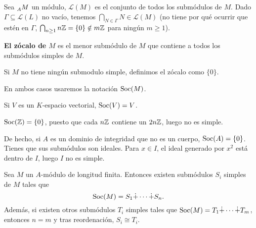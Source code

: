 Sea \(\prescript{}{A}{M}\) un módulo, \(\mathcal{L}(M)\)
es el conjunto de todos los submódulos de \(M\).
Dado \(\Gamma\subseteq\mathcal{L}(L)\) no vacío,
tenemos \(\bigcap_{N\in\Gamma}
N\in\mathcal{L}(M)\) (no tiene por qué ocurrir que estén en \(\Gamma\),
\(\bigcap_{n\ge 1} n\mathbb{Z}=\{0\}\notin m\mathbb{Z}\) para ningún \(m\ge 1\)).


\begin{df}[Zócalo]
  \textbf{El zócalo de \(M\)} es el menor submódulo de \(M\) que contiene a todos
  los submódulos simples de \(M\).

  Si \(M\) no tiene ningún submodulo simple, definimos el zócalo como
  \(\{0\}\).

  En ambos casos usaremos la notación \(\operatorname{Soc}(M)\).
\end{df}

\begin{ejemplo}
  Si \(V\) es un \(K\)-espacio vectorial, \(\operatorname{Soc}(V)=V\).
\end{ejemplo}

\begin{ejemplo}
  \(\operatorname{Soc}(\mathbb{Z})=\{0\}\), puesto que cada \(n\mathbb{Z}\) contiene
  un \(2n\mathbb{Z}\), luego no es simple.
\end{ejemplo}

De hecho, si \(A\) es un dominio de
integridad que no es un cuerpo, \(\operatorname{Soc}(A)=\{0\}\). Tienes que sus submódulos
son ideales. Para \(x\in I\), el ideal generado por \(x^2\) está dentro de
\(I\), luego \(I\) no es simple.

\begin{prop}
  Sea \(M\) un \(A\)-módulo de longitud finita. Entonces existen submódulos
  \(S_i\) simples de \(M\)
  tales que
  \[
    \operatorname{Soc}(M)=S_1\dot{+}\cdots\dot{+} S_n.
  \]
  Además, si existen otros submódulos \(T_i\) simples tales que
  \(
    \operatorname{Soc}(M)=T_1\dot{+}\cdots\dot{+} T_m
  \), entonces \(n=m\) y tras reordenación, \(S_i\cong T_i\).
\end{prop}


